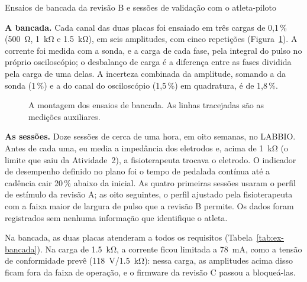 \begin{atividade}{Ensaios de bancada da revisão B e sessões de validação com o atleta-piloto}
\begin{desenvolvimento}
\textbf{A bancada.} Cada canal das duas placas foi ensaiado em três cargas de 0,1\,\% (\SI{500}{\ohm},
\SI{1}{\kilo\ohm} e \SI{1,5}{\kilo\ohm}), em seis amplitudes, com cinco repetições
(Figura~\ref{fig:ex-bancada}). A corrente foi medida com a sonda, e a carga de cada fase, pela integral
do pulso no próprio osciloscópio; o desbalanço de carga é a diferença entre as fases dividida pela
carga de uma delas. A incerteza combinada da amplitude, somando a da sonda (1\,\%) e a do canal do
osciloscópio (1,5\,\%) em quadratura, é de 1,8\,\%.

\begin{figure}[htbp]
  \centering
  \resizebox{0.92\linewidth}{!}{}
  \caption{A montagem dos ensaios de bancada. As linhas tracejadas são as medições auxiliares.}
  \label{fig:ex-bancada}
\end{figure}

\textbf{As sessões.} Doze sessões de cerca de uma hora, em oito semanas, no LABBIO. Antes de cada uma,
eu media a impedância dos eletrodos e, acima de \SI{1}{\kilo\ohm} (o limite que saiu da
Atividade~2), a fisioterapeuta trocava o eletrodo. O indicador de desempenho definido no plano foi o
tempo de pedalada contínua até a cadência cair 20\,\% abaixo da inicial. As quatro primeiras sessões
usaram o perfil de estímulo da revisão A; as oito seguintes, o perfil ajustado pela fisioterapeuta com
a faixa maior de largura de pulso que a revisão B permite. Os dados foram registrados sem nenhuma
informação que identifique o atleta.
\end{desenvolvimento}

\begin{resultados}
Na bancada, as duas placas atenderam a todos os requisitos (Tabela~\ref{tab:ex-bancada}). Na carga de
\SI{1,5}{\kilo\ohm}, a corrente ficou limitada a \SI{78}{\milli\ampere}, como a tensão de conformidade
prevê (\SI{118}{\volt}/\SI{1,5}{\kilo\ohm}): nessa carga, as amplitudes acima disso ficam fora da
faixa de operação, e o firmware da revisão C passou a bloqueá-las.


\end{resultados}
\end{atividade}
